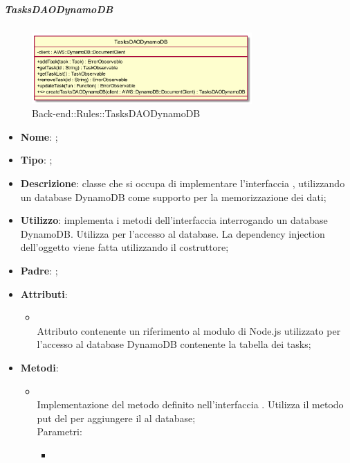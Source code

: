 \hypertarget{TasksDAODynamoDB_label}{\subparagraph{TasksDAODynamoDB}}
\begin{figure}[h]
	\centering
	\includegraphics[width=0.75\textwidth,height=\textheight,keepaspectratio]{images/ClassTasksDAODynamoDB.png}
	\caption{Back-end::Rules::TasksDAODynamoDB}
\end{figure}
\begin{itemize}
	\item \textbf{Nome}: ;
	\item \textbf{Tipo}: ;
	\item \textbf{Descrizione}: classe che si occupa di implementare l'interfaccia , utilizzando un database DynamoDB come supporto per la memorizzazione dei dati;
	\item \textbf{Utilizzo}: implementa i metodi dell'interfaccia  interrogando un database DynamoDB. Utilizza  per l'accesso al database. La dependency injection dell'oggetto  viene fatta utilizzando il costruttore;
	\item \textbf{Padre}: ;
	\item \textbf{Attributi}:
	\begin{itemize}
		\item[]  \\
		Attributo contenente un riferimento al modulo di Node.js utilizzato per l'accesso al database DynamoDB contenente la tabella dei tasks;
	\end{itemize}
	\item \textbf{Metodi}:
	\begin{itemize}
		\item[]  \\		Implementazione del metodo definito nell'interfaccia . Utilizza il metodo put del  per aggiungere il  al database;\\
		Parametri:
		\begin{itemize}
			\item {} \\

\end{itemize}
\end{itemize}
\end{itemize}
